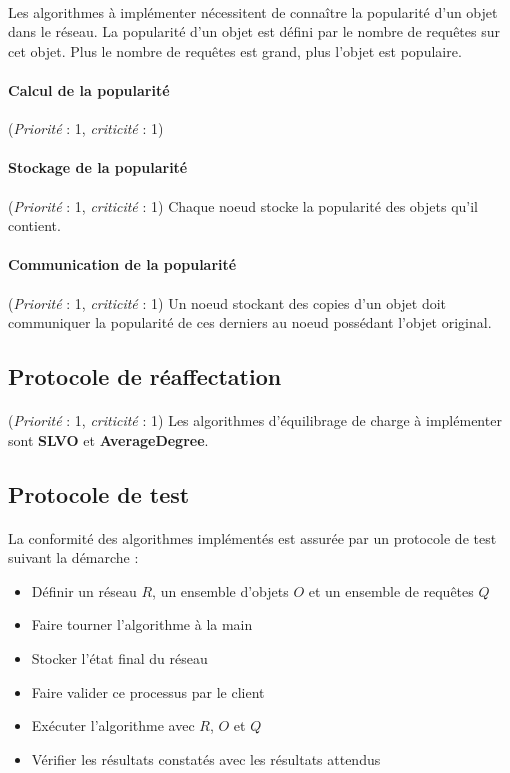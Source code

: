 \documentclass[12pt]{article}
\newcommand{\besoin}[2] {
  (\textit{Priorité} : #1, \textit{criticité} : #2)
}
\begin{document}
\paragraph{} Les algorithmes à implémenter nécessitent de connaître la popularité d'un objet dans le réseau.
La popularité d'un objet est défini par le nombre de requêtes sur cet objet. Plus le nombre de requêtes est grand, plus l'objet est populaire.

\paragraph{Calcul de la popularité} \besoin{1}{1}

\paragraph{Stockage de la popularité} \besoin{1}{1} Chaque noeud stocke la popularité des objets qu'il contient.

\paragraph{Communication de la popularité} \besoin{1}{1} Un noeud stockant des copies d'un objet doit communiquer la popularité de ces derniers au noeud possédant l'objet original.


\subsection{Protocole de réaffectation}

\paragraph{} \besoin{1}{1} Les algorithmes d'équilibrage de charge à implémenter sont \textbf{SLVO} et \textbf{AverageDegree}.


\subsection{Protocole de test}

\paragraph{} La conformité des algorithmes implémentés est assurée par un protocole de test suivant la démarche :

\begin{itemize}
	\item Définir un réseau $R$, un ensemble d'objets $O$ et un ensemble de requêtes $Q$
	\item Faire tourner l'algorithme à la main
	\item Stocker l'état final du réseau
	\item Faire valider ce processus par le client
	\item Exécuter l'algorithme avec $R$, $O$ et $Q$
	\item Vérifier les résultats constatés avec les résultats attendus
\end{itemize}
	
\end{document}
